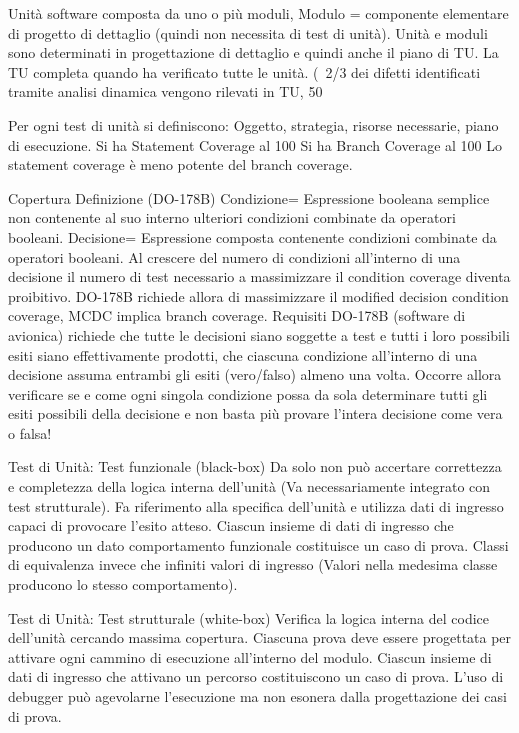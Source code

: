 \documentclass{report}
\begin{document}
Unità software composta da uno o più moduli, Modulo = componente elementare di progetto di dettaglio (quindi non necessita di test di unità).
Unità e moduli sono determinati in progettazione di dettaglio e quindi anche il piano di TU. La TU completa quando ha verificato tutte le unità.
(~2/3 dei difetti identificati tramite analisi dinamica vengono rilevati in TU, 50%

Per ogni test di unità si definiscono: Oggetto, strategia, risorse necessarie, piano di esecuzione.
Si ha Statement Coverage al 100%
Si ha Branch Coverage al 100%
Lo statement coverage è meno potente del branch coverage.

Copertura 
Definizione (DO-178B)
Condizione= Espressione booleana semplice non contenente al suo interno ulteriori condizioni combinate da operatori booleani.
Decisione= Espressione composta contenente condizioni combinate da operatori booleani.
Al crescere del numero di condizioni all’interno di una decisione il numero di test necessario a massimizzare il condition coverage diventa proibitivo.
DO-178B richiede allora di massimizzare il modified decision condition coverage, MCDC implica branch coverage.
Requisiti DO-178B (software di avionica) richiede che tutte le decisioni siano soggette a test e tutti i loro possibili esiti siano effettivamente prodotti, che ciascuna condizione all’interno di una decisione assuma entrambi gli esiti (vero/falso) almeno una volta.
Occorre allora verificare se e come ogni singola condizione possa da sola determinare tutti gli esiti possibili della decisione e non basta più provare l’intera decisione come vera o falsa!

Test di Unità: Test funzionale (black-box)
Da solo non può accertare correttezza e completezza della logica interna dell’unità (Va necessariamente integrato con test strutturale).
Fa riferimento alla specifica dell’unità e utilizza dati di ingresso capaci di provocare l’esito atteso.
Ciascun insieme di dati di ingresso che producono un dato comportamento funzionale costituisce un caso di prova.
Classi di equivalenza invece che infiniti valori di ingresso (Valori nella medesima classe producono lo stesso comportamento).

Test di Unità: Test strutturale (white-box)
Verifica la logica interna del codice dell’unità cercando massima copertura.
Ciascuna prova deve essere progettata per attivare ogni cammino di esecuzione all’interno del modulo.
Ciascun insieme di dati di ingresso che attivano un percorso costituiscono un caso di prova.
L’uso di debugger può agevolarne l’esecuzione ma non esonera dalla progettazione dei casi di prova.
\end{document}

